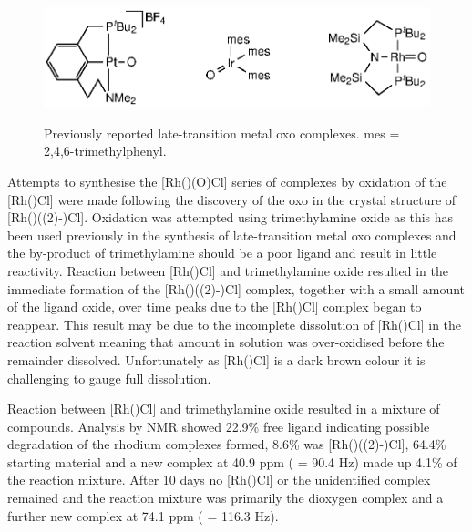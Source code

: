 \begin{figure}[htb]
\begin{center}
\vspace{0.5cm}
\includegraphics{../Figures/Rhodiumotheroxo.eps}
\caption[Previously reported late-transition metal oxo complexes]{Previously reported late-transition metal oxo complexes. mes = 2,4,6-trimethylphenyl.}
\vspace{0.2cm}
\label{Rhodiumotheroxo}
\end{center}
\end{figure}
\vspace{0.2cm}

Attempts to synthesise the [Rh(\tBuxantphos)(O)Cl] series of complexes by oxidation of the [Rh(\tBuxantphos)Cl] were made following the discovery of the oxo in the crystal structure of [Rh(\tBuxantphos)(\hapto(2)-)Cl].  Oxidation was attempted using trimethylamine oxide as this has been used previously in the synthesis of late-transition metal oxo complexes\cite{Motherwell1993, Tsvetkov2013} and the by-product of trimethylamine should be a poor ligand and result in little reactivity.    Reaction between [Rh(\tBusixantphos)Cl] and trimethylamine oxide resulted in the immediate formation of the [Rh(\tBusixantphos)(\hapto(2)-)Cl] complex, together with a small amount of the ligand oxide, over time peaks due to the [Rh(\tBusixantphos)Cl] complex began to reappear.  This result may be due to the incomplete dissolution of [Rh(\tBusixantphos)Cl] in the  reaction solvent meaning that amount in solution was over-oxidised before the remainder dissolved.  Unfortunately as [Rh(\tBusixantphos)Cl] is a dark brown colour it is challenging to gauge full dissolution.  

Reaction between [Rh(\tButhixantphos)Cl] and trimethylamine oxide resulted in a mixture of compounds.  Analysis by \phosphorus{} NMR showed 22.9\%{} free \tButhixantphos{} ligand indicating possible degradation of the rhodium complexes formed, 8.6\%{} was [Rh(\tBusixantphos)(\hapto(2)-)Cl], 64.4\% starting material and a new complex at 40.9 ppm (\JRhP{} = 90.4 Hz) made up 4.1\% of the reaction mixture.  After 10 days no [Rh(\tButhixantphos)Cl] or the unidentified complex remained and the reaction mixture was primarily the dioxygen complex and a further new complex at 74.1 ppm (\JRhP{} = 116.3 Hz).  

